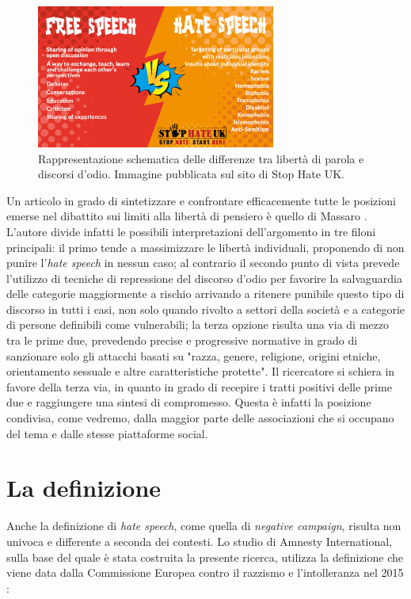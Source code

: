 \begin{figure}
	\centering
	\includegraphics[width=0.7\textwidth]{figures/hatefreespeech}
	\caption{Rappresentazione schematica delle differenze tra libertà di parola e discorsi d'odio. Immagine pubblicata sul sito di Stop Hate UK.}
	\label{hatefreespeech}
\end{figure}

Un articolo in grado di sintetizzare e confrontare efficacemente tutte le posizioni emerse nel dibattito sui limiti alla libertà di pensiero è quello di Massaro \citep{massaro1990}. L'autore divide infatti le possibili interpretazioni dell'argomento in tre filoni principali: il primo tende a massimizzare le libertà individuali, proponendo di non punire l'\textit{hate speech} in nessun caso; al contrario il secondo punto di vista prevede l'utilizzo di tecniche di repressione del discorso d'odio per favorire la salvaguardia delle categorie maggiormente a rischio arrivando a ritenere punibile questo tipo di discorso in tutti i casi, non solo quando rivolto a settori della società e a categorie di persone definibili come vulnerabili; la terza opzione risulta una via di mezzo tra le prime due, prevedendo precise e progressive normative in grado di sanzionare solo gli attacchi basati su "razza, genere, religione, origini etniche, orientamento sessuale e altre caratteristiche protette". Il ricercatore si schiera in favore della terza via, in quanto in grado di recepire  i tratti positivi delle prime due e raggiungere una sintesi di compromesso. Questa è infatti la posizione condivisa, come vedremo, dalla maggior parte delle associazioni che si occupano del tema e dalle stesse piattaforme social.


\section{La definizione}
Anche la definizione di \textit{hate speech}, come quella di \textit{negative campaign},  risulta non univoca e differente a seconda dei contesti. Lo studio di Amnesty International, sulla base del quale è stata costruita la  presente ricerca, utilizza la definizione che viene data dalla Commissione Europea contro il razzismo e l'intolleranza nel 2015 \citep{ecri2015}:

